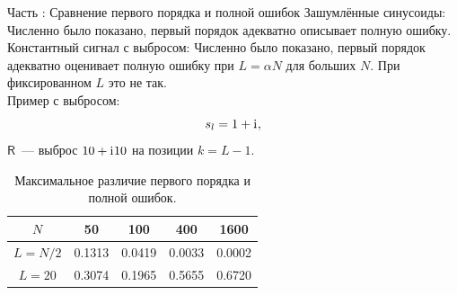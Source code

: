 \documentclass[10pt, ucs, notheorems, handout]{beamer}
\newcommand{\tX}[1]{\mathsf{#1}}
\newcommand{\iu}{\mathrm{i}\mkern1mu}
\newcommand{\RomanNumeralCaps}[1]
{\MakeUppercase{\romannumeral #1}}
\begin{document}
%

\begin{frame}{Часть \RomanNumeralCaps{2}: Сравнение первого порядка и полной ошибок}
\alert{Зашумлённые синусоиды:} Численно было показано, первый порядок адекватно описывает полную ошибку.\\
\vspace{1em}
\alert{Константный сигнал с выбросом:} Численно было показано, первый порядок адекватно оценивает полную ошибку при $L = \alpha N$ для больших $N$. При фиксированном $L$ это не так.\\
\vspace{1em}
\alert{Пример с выбросом:}
$$s_l = 1 + \iu,$$
$\tX{R}$~--- выброс $10 + \iu 10$ на позиции $k = L - 1$.

\begin{table}[H]
	\begin{center}
		\caption{Максимальное различие первого порядка и полной ошибок.}
		\label{tab:const_outl}
		\begin{tabular}{|c|c|c|c|c|}
			\hline
			$N$	& 50 & 100 & 400 & 1600 \\
			\hline
			$L = N / 2$ & 0.1313  & 0.0419  & 0.0033 & 0.0002 \\
			\hline
			$L = 20$ & 0.3074  & 0.1965  & 0.5655 & 0.6720 \\
			\hline
		\end{tabular}
	\end{center}
\end{table}

\end{frame}
\end{document}
